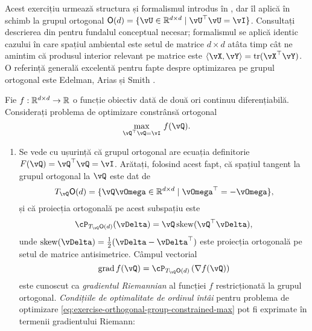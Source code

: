 \documentclass[../../book-main_ro.tex]{subfiles}
\begin{document}
\begin{exercise}\label{exercise:orthogonal-group-calculus}
    Acest exercițiu urmează structura și formalismul introdus în , dar îl aplică în schimb la grupul ortogonal $\O(d) = \set{\vU \in \R^{d \times d} \given \vU^\top \vU = \vI}$.
    Consultați descrierea din  pentru fundalul conceptual necesar; formalismul se aplică identic cazului în care spațiul ambiental este setul de matrice $d \times d$ atâta timp cât ne amintim că produsul interior relevant pe matrice este $\ip{\vX}{\vY} = \tr(\vX^\top \vY)$.
    O referință generală excelentă pentru fapte despre optimizarea pe grupul ortogonal este Edelman, Arias și Smith \cite{Edelman1998-lg}.
    
    Fie $f : \mathbb{R}^{d\times d} \to \mathbb{R}$ o funcție obiectiv dată de două ori continuu diferențiabilă. Considerați problema de optimizare constrânsă ortogonal
    \begin{equation}\label{eq:exercise-orthogonal-group-constrained-max}
        \max_{\vQ^\top \vQ = \vI}\, f(\vQ). 
    \end{equation}
    \begin{enumerate}
        \item Se vede cu ușurință că grupul ortogonal are ecuația definitorie $F(\vQ) = \vQ^\top \vQ = \vI$.
        Arătați, folosind acest fapt, că spațiul tangent la grupul ortogonal la $\vQ$ este dat de
        \begin{equation*}
            T_{\vQ} \O(d) = \set{\vQ \vOmega \in \R^{d\times d} \given \vOmega^\top = - \vOmega},
        \end{equation*}
        și că proiecția ortogonală pe acest subspațiu este
        \begin{equation*}
        \cP_{T_{\vQ}\O(d)}(\vDelta) =  \vQ \Skew(\vQ^\top \vDelta),
        \end{equation*}
        unde $\Skew(\vDelta) = \tfrac{1}{2} ( \vDelta - \vDelta^\top)$ este proiecția ortogonală pe setul de matrice antisimetrice.
        Câmpul vectorial
        \begin{equation}\label{eq:exercise-riemann-grad-orthogonal-group}
        \mathrm{grad}\, f(\vQ) = \cP_{T_{\vQ} \O(d)} \left( \nabla f(\vQ) \right)
        \end{equation}
        este cunoscut ca \textit{gradientul Riemannian} al funcției $f$ restricționată la grupul ortogonal.
        \textit{Condițiile de optimalitate de ordinul întâi} pentru problema de optimizare \eqref{eq:exercise-orthogonal-group-constrained-max} pot fi exprimate în termenii gradientului Riemann:

\end{enumerate}
\end{exercise}
\end{document}
